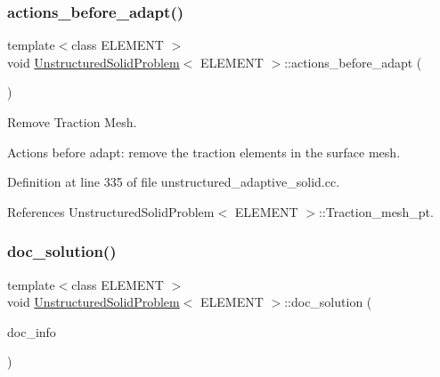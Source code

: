 \mbox{\label{classUnstructuredSolidProblem_a463b4b976fdd12129ac2bd23bece1b8b}} 
\subsubsection{\texorpdfstring{actions\+\_\+before\+\_\+adapt()}{actions\_before\_adapt()}}
{\footnotesize\ttfamily template$<$class E\+L\+E\+M\+E\+NT $>$ \\
void \hyperlink{classUnstructuredSolidProblem}{Unstructured\+Solid\+Problem}$<$ E\+L\+E\+M\+E\+NT $>$\+::actions\+\_\+before\+\_\+adapt (\begin{DoxyParamCaption}{ }\end{DoxyParamCaption})}



Remove Traction Mesh. 

Actions before adapt\+: remove the traction elements in the surface mesh. 

Definition at line 335 of file unstructured\+\_\+adaptive\+\_\+solid.\+cc.



References Unstructured\+Solid\+Problem$<$ E\+L\+E\+M\+E\+N\+T $>$\+::\+Traction\+\_\+mesh\+\_\+pt.

\mbox{\label{classUnstructuredSolidProblem_ab3d66fd61b69d12b4f159d763fc44f15}} 
\subsubsection{\texorpdfstring{doc\+\_\+solution()}{doc\_solution()}}
{\footnotesize\ttfamily template$<$class E\+L\+E\+M\+E\+NT $>$ \\
void \hyperlink{classUnstructuredSolidProblem}{Unstructured\+Solid\+Problem}$<$ E\+L\+E\+M\+E\+NT $>$\+::doc\+\_\+solution (\begin{DoxyParamCaption}\item[{Doc\+Info \&}]{doc\+\_\+info }\end{DoxyParamCaption})}



